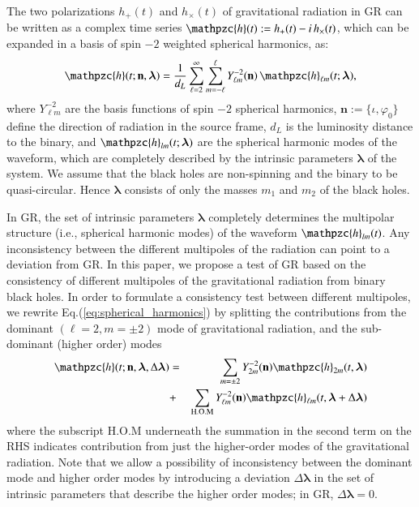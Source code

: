 \documentclass[prl,preprintnumbers,twocolumn,eqsecnum,floatfix,a4paper,nofootinbib,superscriptaddress]{revtex4}
\newcommand{\h}{\mathpzc{h}}
\newcommand{\hlm}{\mathpzc{h}_{\ell m}}
\newcommand{\Ylm}{{Y}^{-2}_{\ell m}}
\newcommand{\blambda}{\bm{\lambda}}
\newcommand{\n}{\mathbf{n}}
\begin{document}
The two polarizations $h_+(t)$ and $h_\times(t)$ of gravitational radiation in GR can be written as a complex time series $\h(t) := h_+(t) - i \, h_\times(t)$, which can be expanded in a basis of spin $-2$ weighted spherical harmonics, as:
\begin{equation}
\h(t; \n, \blambda) =  \frac{1}{d_L} \sum _{\ell=2}^{\infty} \sum _{m=-\ell}^{\ell} \Ylm (\n) \, {{\hlm}(t; \blambda)}, 
\label{eq:spherical_harmonics}
\end{equation}
where $\Ylm$ are the basis functions of spin $-2$ spherical harmonics, $\n := \{\iota, \varphi_0\}$ define the direction of radiation in the source frame, $d_L$ is  the luminosity distance to the binary, and ${\h}_{lm}(t; \blambda)$ are the spherical harmonic modes of the waveform, which are completely described by the intrinsic parameters $\blambda$ of the system. We assume that the black holes are non-spinning and the binary to be quasi-circular. Hence $\blambda$ consists of only the masses $m_1$ and $m_2$ of the black holes. 

In GR, the set of intrinsic parameters $\blambda$ completely determines the multipolar structure (i.e., spherical harmonic modes) of the waveform ${\h}_{lm}(t)$. Any inconsistency between the different multipoles of the radiation can point to a deviation from GR. In this paper, we propose a test of GR based on the consistency of different multipoles of the gravitational radiation from binary black holes. In order to formulate a consistency test between different multipoles, we rewrite Eq.(\ref{eq:spherical_harmonics}) by splitting the contributions from the dominant $(\ell = 2, m = \pm 2)$ mode of gravitational radiation, and the sub-dominant (higher order) modes 
\begin{eqnarray}
\h(t; \n, \blambda, \Delta \blambda) & = & \sum_{m = \pm2} Y^{-2}_{2m} (\n) {\h}_{2m}(t, \blambda)  \nonumber \\ 
& + & \sum _{\text{H.O.M}} \Ylm (\n) \hlm(t, \blambda+\Delta \blambda)
\label{eq:test_HM}
\end{eqnarray}
where the subscript H.O.M underneath the summation in the second term on the RHS indicates contribution from just the higher-order modes of the gravitational radiation. Note that we allow a possibility of inconsistency between the dominant mode and higher order modes by introducing a deviation $\Delta \blambda$ in the set of intrinsic parameters that describe the higher order modes; in GR,  $\Delta \blambda = 0$. 
\end{document}
